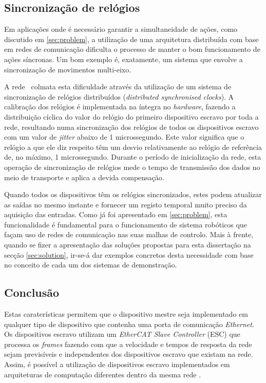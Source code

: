 \subsection{Sincronização de relógios}
Em aplicações onde é necessário garantir a simultaneidade de ações, como
discutido em \ref{sec:problem}, a utilização de uma arquitetura distribuída
com base em redes de comunicação dificulta o processo de manter o bom
funcionamento de ações síncronas. Um bom exemplo é, exatamente, um sistema
que envolve a sincronização de movimentos multi-eixo.

A rede \ecat\ colmata esta dificuldade através da utilização de um sistema
de sincronização de relógios distribuídos (\emph{distributed synchronised
clocks}). A calibração dos relógios é implementada na íntegra no
\emph{hardware}, fazendo a distribuição cíclica do valor do relógio do
primeiro dispositivo escravo por toda a rede, resultando numa sincronização
dos relógios de todos os dispositivos escravo com um valor de \emph{jitter}
abaixo de 1 microssegundo. Este valor significa que o relógio a que ele
diz respeito têm um desvio relativamente ao relógio de referência de,
no máximo, 1 microssegundo. Durante o período de inicialização da rede,
esta operação de sincronização de relógios mede o tempo de transmissão
dos dados no meio de transporte e aplica a devida compensação.

Quando todos os dispositivos têm os relógios sincronizados, estes podem
atualizar as saídas no mesmo instante e fornecer um registo temporal
muito preciso da aquisição das entradas. Como já foi apresentado em
\ref{sec:problem}, esta funcionalidade é fundamental para o funcionamento
de sistema robóticos que façam uso de redes de comunicação nas suas
malhas de controlo. Mais à frente, quando se fizer a apresentação das
soluções propostas para esta dissertação na secção \ref{sec:solution},
ir-se-á dar exemplos concretos desta necessidade com base no conceito
de cada um dos sistemas de demonstração.


\subsection{Conclusão}
Estas caraterísticas permitem que o dispositivo mestre seja implementado
em qualquer tipo de dispositivo que contenha uma porta de comunicação 
\emph{Ethernet}. Os dispositivos escravo utilizam um \emph{EtherCAT Slave
Controller} (ESC) que processa os \emph{frames} fazendo com que a velocidade
e tempos de resposta da rede sejam previsíveis e independentes dos 
dispositivos escravo que existam na rede. Assim, é possível a utilização
de dispositivos escravo implementados em arquiteturas de computação
diferentes dentro da mesma rede \ecat.


